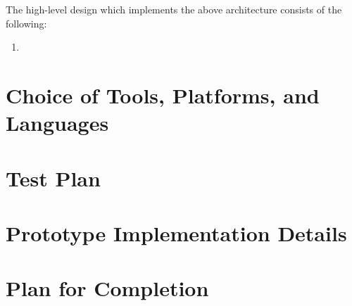 \documentclass{scrreprt}
\begin{document}
The high-level design which implements the above architecture consists of the following:
\begin{enumerate}
    \item 
\end{enumerate}











\chapter {Choice of Tools, Platforms, and Languages}




\chapter{Test Plan}




\chapter{Prototype Implementation Details}




\chapter{Plan for Completion}
\end{document}
